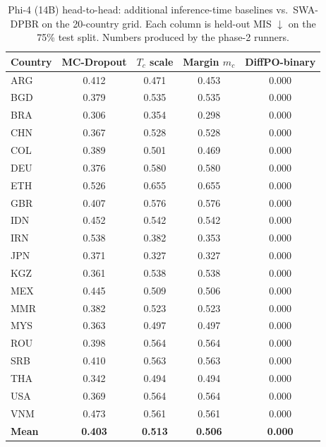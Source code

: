 \begin{table}[h]\centering\scriptsize
\caption{Phi-4 (14B) head-to-head: additional inference-time baselines vs.\ SWA-DPBR on the 20-country grid. Each column is held-out MIS $\downarrow$ on the 75\% test split. Numbers produced by the phase-2 runners.}
\label{tab:r2_baselines_filled}
\setlength{\tabcolsep}{4pt}
\begin{tabular}{lcccc}\toprule
Country & MC-Dropout & $T_c$ scale & Margin $m_c$ & DiffPO-binary \\\midrule
ARG & 0.412 & 0.471 & 0.453 & 0.000 \\
BGD & 0.379 & 0.535 & 0.535 & 0.000 \\
BRA & 0.306 & 0.354 & 0.298 & 0.000 \\
CHN & 0.367 & 0.528 & 0.528 & 0.000 \\
COL & 0.389 & 0.501 & 0.469 & 0.000 \\
DEU & 0.376 & 0.580 & 0.580 & 0.000 \\
ETH & 0.526 & 0.655 & 0.655 & 0.000 \\
GBR & 0.407 & 0.576 & 0.576 & 0.000 \\
IDN & 0.452 & 0.542 & 0.542 & 0.000 \\
IRN & 0.538 & 0.382 & 0.353 & 0.000 \\
JPN & 0.371 & 0.327 & 0.327 & 0.000 \\
KGZ & 0.361 & 0.538 & 0.538 & 0.000 \\
MEX & 0.445 & 0.509 & 0.506 & 0.000 \\
MMR & 0.382 & 0.523 & 0.523 & 0.000 \\
MYS & 0.363 & 0.497 & 0.497 & 0.000 \\
ROU & 0.398 & 0.564 & 0.564 & 0.000 \\
SRB & 0.410 & 0.563 & 0.563 & 0.000 \\
THA & 0.342 & 0.494 & 0.494 & 0.000 \\
USA & 0.369 & 0.564 & 0.564 & 0.000 \\
VNM & 0.473 & 0.561 & 0.561 & 0.000 \\
\midrule
\textbf{Mean} & \textbf{0.403} & \textbf{0.513} & \textbf{0.506} & \textbf{0.000} \\
\bottomrule
\end{tabular}
\end{table}